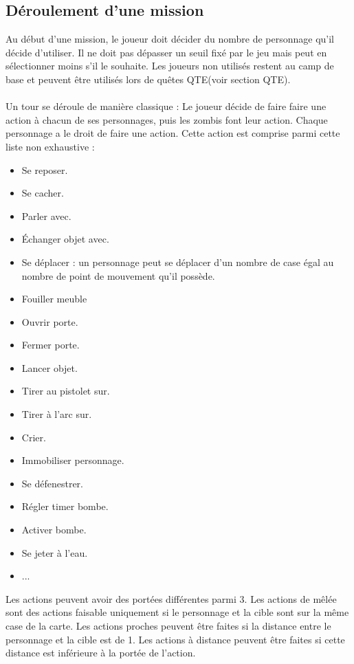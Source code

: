 \subsection{Déroulement d'une mission}
Au début d'une mission, le joueur doit décider du nombre de personnage qu'il décide d'utiliser. Il ne doit pas dépasser un seuil fixé par le jeu mais peut en sélectionner moins s'il le souhaite. Les joueurs non utilisés restent au camp de base et peuvent être utilisés lors de quêtes QTE(voir section QTE).
\\\\
Un tour se déroule de manière classique : Le joueur décide de faire faire une action à chacun de ses personnages, puis les zombis font leur action. Chaque personnage a le droit de faire une action. Cette action est comprise parmi cette liste non exhaustive :
\begin{itemize}
  \item Se reposer.
  \item Se cacher.
  \item Parler avec.
  \item Échanger objet avec.
  \item Se déplacer : un personnage peut se déplacer d'un nombre de case égal au nombre de point de mouvement qu'il possède.
  \item Fouiller meuble
  \item Ouvrir porte.
  \item Fermer porte.
  \item Lancer objet.
  \item Tirer au pistolet sur.
  \item Tirer à l'arc sur.
  \item Crier.
  \item Immobiliser personnage.
  \item Se défenestrer.
  \item Régler timer bombe.
  \item Activer bombe.
  \item Se jeter à l'eau.
  \item ...
\end{itemize}
Les actions peuvent avoir des portées différentes parmi 3. Les actions de mêlée sont des actions faisable uniquement si le personnage et la cible sont sur la même case de la carte. Les actions proches peuvent être faites si la distance entre le personnage et la cible est de 1. Les actions à distance peuvent être faites si cette distance est inférieure à la portée de l'action.
\\\\
